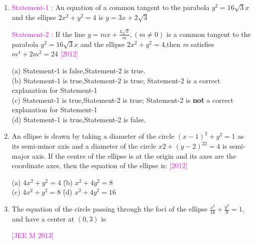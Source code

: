\documentclass[journal,12pt,twocolumn]{IEEEtran}
\theoremstyle{remark}
\begin{document}
\begin{enumerate}[label=\textcolor{magenta}{\arabic*.}]
    \begin{tabbing}
        (a) $5x^2+3y^2-48=0$ \hspace{0em} \= (b) $3x^2+5y^2-15=0$ \\
        (c) $5x^2+3y^2-32=0$ \hspace{0em} \= (d) $3x^2+5y^2-32=0$ \\
    \end{tabbing}
    \item
    \textcolor{magenta}{Statement-1 :} An equation of a common tangent to the parabola $y^2=16\sqrt{3}x$ and the ellipse $2x^2+y^2=4$ is $y=3x+2\sqrt{3}$
    
    \textcolor{magenta}{Statement-2 :} If the line $y=mx+\frac{4\sqrt{3}}{m},(m\neq0)$ is a common tangent to the parabola $y^2=16\sqrt{3}x$ and the ellipse $2x^2+y^2=4$,then \textit{m} satisfies $m^4+2m^2=24$ 
    \hfill{\textcolor{magenta}{[2012]}}
    
    (a) Statement-1 is false,Statement-2 is true.\\
    (b) Statement-1 is true,Statement-2 is true; Statement-2
    is a correct explanation for Statement-1\\
    (c) Statement-1 is true,Statement-2 is true; Statement-2
    is \textbf{not} a correct explanation for Statement-1\\
    (d) Statement-1 is true,Statement-2 is false.\\
    \item An ellipse is drawn by taking a diameter of the circle $(x-1)^2+y^2=1$ as its semi-minor axis and a diameter of the circle $x2+(y-2)^22=4$ is semi-major axis. If the centre of the ellipse is at the origin and its axes are the coordinate axes, then the equation of the ellipse is: 
    \hfill{\textcolor{magenta}{[2012]}}
    
    \begin{tabbing}
        (a) $4x^2+y^2=4$ \hspace{3em} \= (b) $x^2+4y^2=8$ \\
        (c) $4x^2+y^2=8$ \hspace{3em} \= (d) $x^2+4y^2=16$ \\
    \end{tabbing}
    \item The equation of the circle passing through the foci of the ellipse $\frac{x^2}{16}+\frac{y^2}{9}=1$, and have a center at $(0,3)$ is
    
    \hfill{\textcolor{magenta}{[JEE M 2013]}}
    

\end{enumerate}
\end{document}
